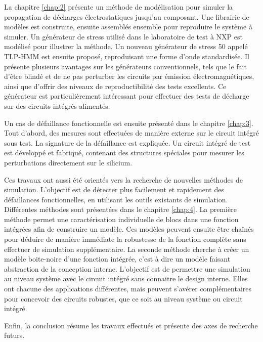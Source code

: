 %
La chapitre \ref{chap:2} présente un méthode de modélisation pour simuler la propagation de décharges électrostatiques jusqu'au composant.
Une librairie de modèles est construite, ensuite assemblés ensemble pour reproduire le système à simuler.
Un générateur de stress utilisé dans le laboratoire de test à NXP est modélisé pour illustrer la méthode.
Un nouveau générateur de stress 50 \textOmega{} appelé TLP-HMM est ensuite proposé, reproduisant une forme d'onde standardisée.
Il présente plusieurs avantages sur les générateurs conventionnels, tels que le fait d'être blindé et de ne pas perturber les circuits par émission électromagnétiques, ainsi que d'offrir des niveaux de reproductibilité des tests excellents.
Ce générateur est particulièrement intéressant pour effectuer des tests de décharge sur des circuits intégrés alimentés.

%
Un cas de défaillance fonctionnelle est ensuite présenté dans le chapitre \ref{chap:3}.
Tout d'abord, des mesures sont effectuées de manière externe sur le circuit intégré sous test.
La signature de la défaillance est expliquée.
Un circuit intégré de test est développé et fabriqué, contenant des structures spéciales pour mesurer les perturbations directement sur le silicium.

%
Ces travaux ont aussi été orientés vers la recherche de nouvelles méthodes de simulation.
L'objectif est de détecter plus facilement et rapidement des défaillances fonctionnelles, en utilisant les outils existants de simulation.
Différentes méthodes sont présentées dans le chapitre \ref{chap:4}.
La première méthode permet une caractérisation individuelle de blocs dans une fonction intégrées afin de construire un modèle.
Ces modèles peuvent ensuite être chaînés pour déduire de manière immédiate la robustesse de la fonction complète sans effectuer de simulation supplémentaire.
La seconde méthode cherche à créer un modèle boite-noire d'une fonction intégrée, c'est à dire un modèle faisant abstraction de la conception interne.
L'objectif est de permettre une simulation au niveau système avec le circuit intégré sans connaitre le design interne.
Elles ont chacune des applications différentes, mais peuvent s'avérer complémentaires pour concevoir des circuits robustes, que ce soit au niveau système ou circuit intégré.

%
Enfin, la conclusion résume les travaux effectués et présente des axes de recherche futurs.
